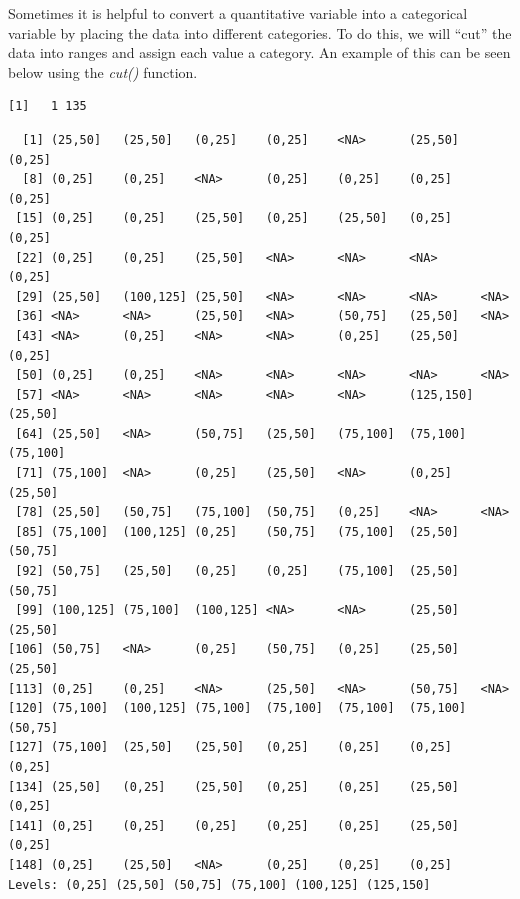 \documentclass[
  letterpaper,
  DIV=11,
  numbers=noendperiod]{scrreprt}
\newenvironment{Shaded}{\begin{snugshade}}{\end{snugshade}}
\newcommand{\AttributeTok}[1]{\textcolor[rgb]{0.40,0.45,0.13}{#1}}
\newcommand{\ConstantTok}[1]{\textcolor[rgb]{0.56,0.35,0.01}{#1}}
\newcommand{\DecValTok}[1]{\textcolor[rgb]{0.68,0.00,0.00}{#1}}
\newcommand{\FunctionTok}[1]{\textcolor[rgb]{0.28,0.35,0.67}{#1}}
\newcommand{\NormalTok}[1]{\textcolor[rgb]{0.00,0.23,0.31}{#1}}
\newcommand{\SpecialCharTok}[1]{\textcolor[rgb]{0.37,0.37,0.37}{#1}}
\begin{document}
Sometimes it is helpful to convert a quantitative variable into a
categorical variable by placing the data into different categories. To
do this, we will ``cut'' the data into ranges and assign each value a
category. An example of this can be seen below using the \emph{cut()}
function.

\begin{Shaded}
\end{Shaded}

\begin{verbatim}
[1]   1 135
\end{verbatim}

\begin{Shaded}
\end{Shaded}

\begin{verbatim}
  [1] (25,50]   (25,50]   (0,25]    (0,25]    <NA>      (25,50]   (0,25]   
  [8] (0,25]    (0,25]    <NA>      (0,25]    (0,25]    (0,25]    (0,25]   
 [15] (0,25]    (0,25]    (25,50]   (0,25]    (25,50]   (0,25]    (0,25]   
 [22] (0,25]    (0,25]    (25,50]   <NA>      <NA>      <NA>      (0,25]   
 [29] (25,50]   (100,125] (25,50]   <NA>      <NA>      <NA>      <NA>     
 [36] <NA>      <NA>      (25,50]   <NA>      (50,75]   (25,50]   <NA>     
 [43] <NA>      (0,25]    <NA>      <NA>      (0,25]    (25,50]   (0,25]   
 [50] (0,25]    (0,25]    <NA>      <NA>      <NA>      <NA>      <NA>     
 [57] <NA>      <NA>      <NA>      <NA>      <NA>      (125,150] (25,50]  
 [64] (25,50]   <NA>      (50,75]   (25,50]   (75,100]  (75,100]  (75,100] 
 [71] (75,100]  <NA>      (0,25]    (25,50]   <NA>      (0,25]    (25,50]  
 [78] (25,50]   (50,75]   (75,100]  (50,75]   (0,25]    <NA>      <NA>     
 [85] (75,100]  (100,125] (0,25]    (50,75]   (75,100]  (25,50]   (50,75]  
 [92] (50,75]   (25,50]   (0,25]    (0,25]    (75,100]  (25,50]   (50,75]  
 [99] (100,125] (75,100]  (100,125] <NA>      <NA>      (25,50]   (25,50]  
[106] (50,75]   <NA>      (0,25]    (50,75]   (0,25]    (25,50]   (25,50]  
[113] (0,25]    (0,25]    <NA>      (25,50]   <NA>      (50,75]   <NA>     
[120] (75,100]  (100,125] (75,100]  (75,100]  (75,100]  (75,100]  (50,75]  
[127] (75,100]  (25,50]   (25,50]   (0,25]    (0,25]    (0,25]    (0,25]   
[134] (25,50]   (0,25]    (25,50]   (0,25]    (0,25]    (25,50]   (0,25]   
[141] (0,25]    (0,25]    (0,25]    (0,25]    (0,25]    (25,50]   (0,25]   
[148] (0,25]    (25,50]   <NA>      (0,25]    (0,25]    (0,25]   
Levels: (0,25] (25,50] (50,75] (75,100] (100,125] (125,150]
\end{verbatim}
\end{document}
